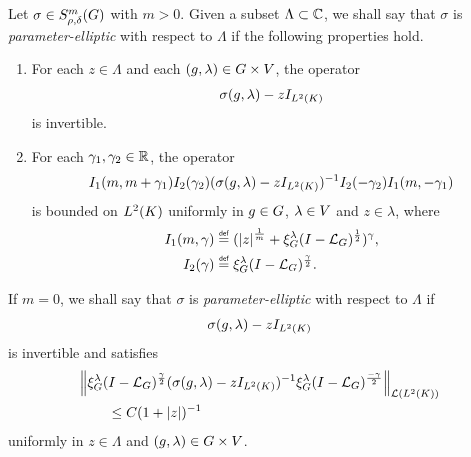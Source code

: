 \begin{definition}
\label{definition:parameter-ellipticity}
    Let $\sigma \in \SymbolClass m {\rho, \delta}$ with $m > 0$.
    Given a subset $\Lambda \subset \C$,
    we shall say that $\sigma$ is \emph{parameter-elliptic} with respect to $\Lambda$
    if the following properties hold.
    \begin{enumerate}
        \item For each $z \in \Lambda$ and each $(g, \lambda) \in \Group \times \VectorSpace$,
            the operator
            \begin{align*}
                \sigma(g, \lambda) - z \Id {\Lebesgue 2 \CompactGroup}
            \end{align*}
            is invertible.
        \item
            For each $\gamma_1, \gamma_2 \in \R$,
            the operator
            \begin{align*}
                I_1(m, m + \gamma_1)
                I_2(\gamma_2)
                (\sigma(g, \lambda) - z \Id {\Lebesgue 2 \CompactGroup})^{-1}
                I_2(-\gamma_2)
                I_1(m, -\gamma_1)
            \end{align*}
            is bounded on $\Lebesgue 2 \CompactGroup$ uniformly in $g \in \Group$, $\lambda \in \VectorSpace$ and $z \in \lambda$,
            where
            \begin{align}
                I_1(m, \gamma) &\defeq (\abs z^{\frac 1 m} + \Rep \lambda \BesselPotential 1)^\gamma,\\
                I_2(\gamma) &\defeq \Rep \lambda \BesselPotential \gamma.
                \label{eq:operators_for_parameter-ellipticity}
            \end{align}
    \end{enumerate}

    If $m = 0$,
    we shall say that $\sigma$ is \emph{parameter-elliptic} with respect to $\Lambda$ if
    \begin{align*}
        \sigma(g, \lambda) - z \Id {\Lebesgue 2 \CompactGroup}
    \end{align*}
    is invertible and satisfies
    \begin{align*}
        &\norm [\Lin {\Lebesgue 2 \CompactGroup}] {
            \Rep \lambda \BesselPotential \gamma
            (\sigma(g, \lambda) - z \Id {\Lebesgue 2 \CompactGroup})^{-1}
            \Rep \lambda \BesselPotential {-\gamma}
        }\\
        &\qquad \leq C(1 + \abs z)^{-1}
    \end{align*}
    uniformly in $z \in \Lambda$ and $(g, \lambda) \in \Group \times \VectorSpace$.
\end{definition}

